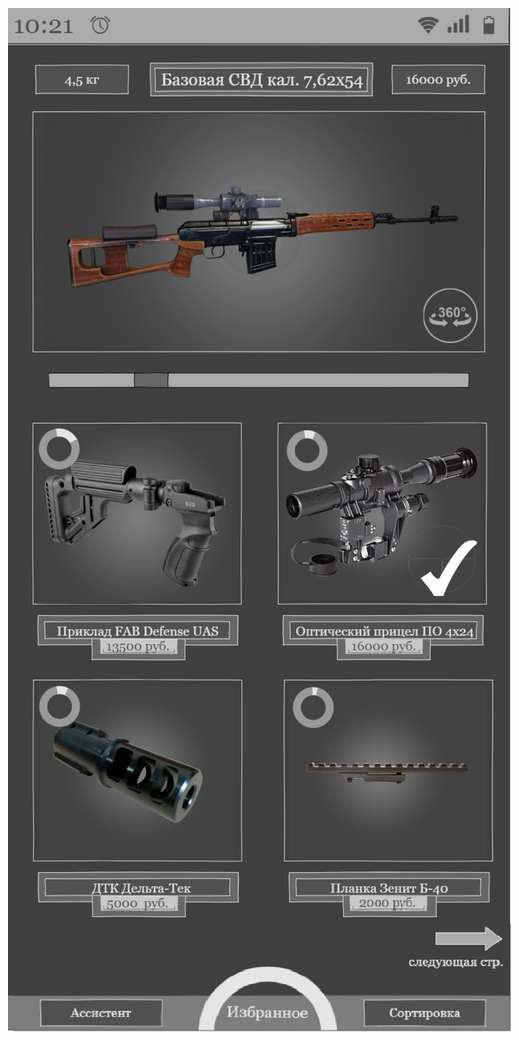 \documentclass[10pt,utf8,presentation,notheorems,xcolor=dvipsnames,compress]{beamer}
\begin{document}
\begin{frame}
\begin{columns}[T]
\begin{column}{.25\textwidth}
\begin{block}{}
	\includegraphics[scale=0.135]{pic}
    \end{block}
    \end{column}
  \end{columns}
\end{frame}
\end{document}
